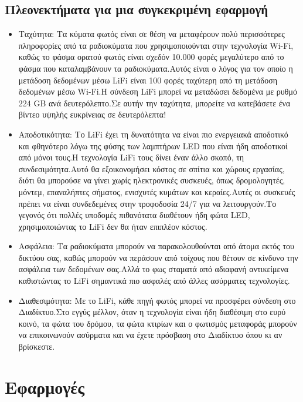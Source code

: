 \documentclass[conference]{IEEEtran}
\begin{document}
\subsection{Πλεονεκτήματα για μια συγκεκριμένη εφαρμογή \cite{b5}}
\begin{itemize}
	\item Ταχύτητα:
Τα κύματα φωτός είναι σε θέση να μεταφέρουν πολύ περισσότερες πληροφορίες από τα ραδιοκύματα που χρησιμοποιούνται στην τεχνολογία Wi-Fi, καθώς το φάσμα ορατού φωτός είναι σχεδόν 10.000 φορές μεγαλύτερο από το φάσμα που καταλαμβάνουν τα ραδιοκύματα.Αυτός είναι ο λόγος για τον οποίο η μετάδοση δεδομένων μέσω LiFi είναι 100 φορές ταχύτερη από τη μετάδοση δεδομένων μέσω Wi-Fi.Η σύνδεση LiFi μπορεί να μεταδώσει δεδομένα με ρυθμό 224 GB ανά δευτερόλεπτο.Σε αυτήν την ταχύτητα, μπορείτε να κατεβάσετε ένα βίντεο υψηλής ευκρίνειας σε δευτερόλεπτα!
	\item Αποδοτικότητα:
Το LiFi έχει τη δυνατότητα να είναι πιο ενεργειακά αποδοτικό και φθηνότερο λόγω της φύσης των λαμπτήρων LED που είναι ήδη αποδοτικοί από μόνοι τους.Η τεχνολογία LiFi τους δίνει έναν άλλο σκοπό, τη συνδεσιμότητα.Αυτό θα εξοικονομήσει κόστος σε σπίτια και χώρους εργασίας, διότι θα μπορούσε να γίνει χωρίς ηλεκτρονικές συσκευές, όπως δρομολογητές, μόντεμ, επαναλήπτες σήματος, ενισχυτές κυμάτων και κεραίες.Αυτές οι συσκευές πρέπει να είναι συνδεδεμένες στην τροφοδοσία 24/7 για να λειτουργούν.Το γεγονός ότι πολλές υποδομές πιθανότατα διαθέτουν ήδη φώτα LED, χρησιμοποιώντας το LiFi δεν θα ήταν επιπλέον κόστος.
	\item Ασφάλεια:
Τα ραδιοκύματα μπορούν να παρακολουθούνται από άτομα εκτός του δικτύου σας, καθώς μπορούν να περάσουν από τοίχους που θέτουν σε κίνδυνο την ασφάλεια των δεδομένων σας.Αλλά το φως σταματά από αδιαφανή αντικείμενα καθιστώντας το LiFi σημαντικά πιο ασφαλές από άλλες ασύρματες τεχνολογίες.
	\item Διαθεσιμότητα:
Με το LiFi, κάθε πηγή φωτός μπορεί να προσφέρει σύνδεση στο Διαδίκτυο.Στο εγγύς μέλλον, όταν η τεχνολογία είναι ήδη διαθέσιμη στο ευρύ κοινό, τα φώτα του δρόμου, τα φώτα κτιρίων και ο φωτισμός μεταφοράς μπορούν να επικοινωνούν ασύρματα και να έχετε πρόσβαση στο Διαδίκτυο όπου κι αν βρίσκεστε.
\end{itemize}
\section{Εφαρμογές}
\end{document}
